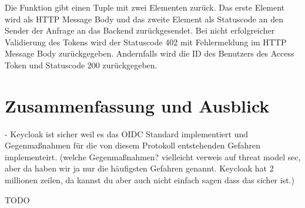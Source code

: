 Die Funktion gibt einen Tuple mit zwei Elementen zurück. Das erste Element wird als HTTP Message Body und das zweite Element als Statuscode an den Sender der Anfrage an das Backend zurückgesendet. Bei nicht erfolgreicher Validierung des Tokens wird der Statuscode 402 mit Fehlermeldung im HTTP Message Body zurückgegeben. Andernfalls wird die ID des Benutzers des Access Token und Statuscode 200 zurückgegeben.


\section{Zusammenfassung und Ausblick}

- Keycloak ist sicher weil es das OIDC Standard implementiert und Gegenmaßnahmen für die von diesem Protokoll entstehenden Gefahren implementeirt. (welche Gegenmaßnahmen? vielleicht verweis auf threat model sec, aber da haben wir ja nur die häufigsten Gefahren genannt. Keycloak hat 2 millionen zeilen, da kannst du aber auch nicht einfach sagen dass das sicher ist.)

TODO





